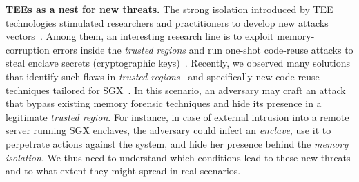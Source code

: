 \vspace{0.5cm}
\noindent \textbf{TEEs as a nest for new threats.}
%
%
The strong isolation introduced by TEE technologies stimulated researchers and 
practitioners to develop new attacks 
vectors~\citep{foreshadow,Murdock2019plundervolt,203183,lee2017hacking}.
Among them, an interesting research line is to exploit memory-corruption 
errors inside the \emph{trusted regions} and run one-shot code-reuse attacks to 
steal enclave secrets (\eg cryptographic keys)~\citep{geometry2007}.
Recently, we observed many solutions that identify such flaws in \emph{trusted 
regions}~\citep{teerex,tale-two-worlds} and specifically new code-reuse 
techniques tailored for SGX~\citep{lee2017hacking,biondo2018guard}.
In this scenario, an adversary may craft an attack that bypass 
existing memory forensic techniques and hide its presence in a legitimate 
\emph{trusted region}.
%
For instance, in case of external intrusion into a remote server running SGX 
enclaves, the adversary could infect an \emph{enclave}, use it to 
perpetrate actions against the system, and hide her presence behind the 
\emph{memory isolation}.
We thus need to understand which conditions lead to these new threats and to 
what extent they might spread in real scenarios.

